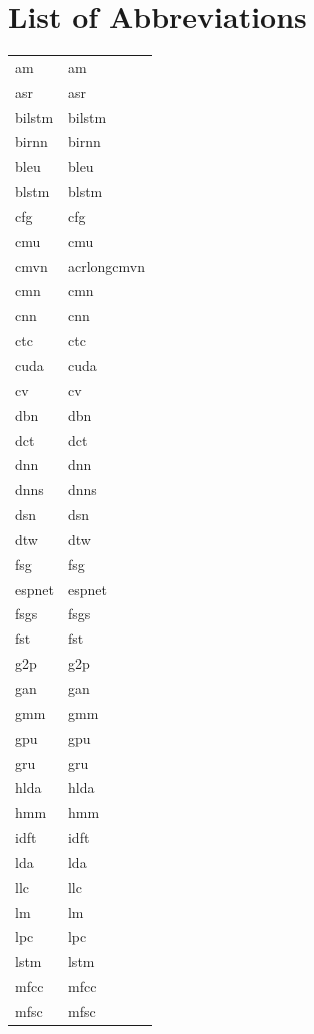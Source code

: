 \documentclass[12pt,twoside]{report}
\begin{document}
\begin{table}[tp]
\chapter*{List of Abbreviations}
  \label{tab:acronymns}
\begin{tabular}{ll}
\acrshort{am} & \acrlong{am}\\
\acrshort{asr} & \acrlong{asr}\\
\acrshort{bilstm} & \acrlong{bilstm}\\
\acrshort{birnn} & \acrlong{birnn}\\
\acrshort{bleu} & \acrlong{bleu}\\
\acrshort{blstm} & \acrlong{blstm}\\
\acrshort{cfg} & \acrlong{cfg} \\
\acrshort{cmu} & \acrlong{cmu} \\
\acrshort{cmvn} & acrlong{cmvn} \\
\acrshort{cmn} & \acrlong{cmn} \\
\acrshort{cnn} & \acrlong{cnn} \\
\acrshort{ctc} & \acrlong{ctc} \\
\acrshort{cuda} & \acrlong{cuda} \\
\acrshort{cv} & \acrlong{cv} \\
\acrshort{dbn} & \acrlong{dbn} \\
\acrshort{dct} & \acrlong{dct} \\
\acrshort{dnn} & \acrlong{dnn} \\
\acrshort{dnns} & \acrlong{dnns} \\
\acrshort{dsn} & \acrlong{dsn} \\
\acrshort{dtw} & \acrlong{dtw} \\
\acrshort{fsg} & \acrlong{fsg} \\
\acrshort{espnet} & \acrlong{espnet} \\
\acrshort{fsgs} & \acrlong{fsgs} \\
\acrshort{fst} & \acrlong{fst} \\
\acrshort{g2p} & \acrlong{g2p} \\
\acrshort{gan} & \acrlong{gan} \\
\acrshort{gmm} & \acrlong{gmm} \\
\acrshort{gpu} & \acrlong{gpu} \\
\acrshort{gru} & \acrlong{gru} \\
\acrshort{hlda} & \acrlong{hlda} \\
\acrshort{hmm} & \acrlong{hmm} \\
\acrshort{idft} & \acrlong{idft} \\
\acrshort{lda} & \acrlong{lda} \\
\acrshort{llc} & \acrlong{llc} \\
\acrshort{lm} & \acrlong{lm} \\
\acrshort{lpc} & \acrlong{lpc} \\
\acrshort{lstm} & \acrlong{lstm} \\
\acrshort{mfcc} & \acrlong{mfcc} \\
\acrshort{mfsc} & \acrlong{mfsc} \\
\end{tabular}
\end{table}
\end{document}
